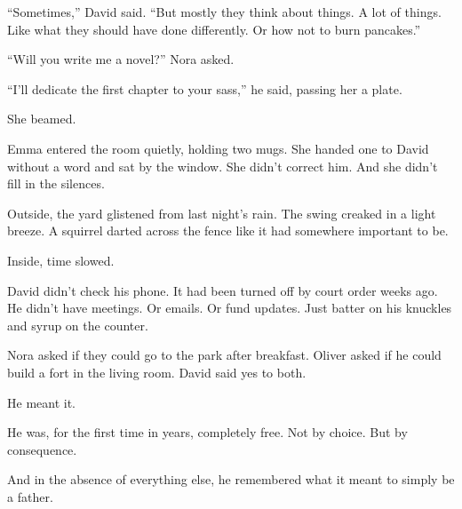``Sometimes,'' David said. ``But mostly they think about things. A lot of things. Like what they should 
have done differently. Or how not to burn pancakes.''

``Will you write me a novel?'' Nora asked.

``I’ll dedicate the first chapter to your sass,'' he said, passing her a plate.

She beamed.

Emma entered the room quietly, holding two mugs. She handed one to David without a word and sat by the 
window. She didn’t correct him. And she didn’t fill in the silences.

Outside, the yard glistened from last night’s rain. The swing creaked in a light breeze. A squirrel 
darted across the fence like it had somewhere important to be.

Inside, time slowed.

David didn’t check his phone. It had been turned off by court order weeks ago.  
He didn’t have meetings. Or emails. Or fund updates.  
Just batter on his knuckles and syrup on the counter.

Nora asked if they could go to the park after breakfast.  
Oliver asked if he could build a fort in the living room.  
David said yes to both.

He meant it.

He was, for the first time in years, completely free.  
Not by choice.  
But by consequence.

And in the absence of everything else,  
he remembered what it meant to simply be a father.

